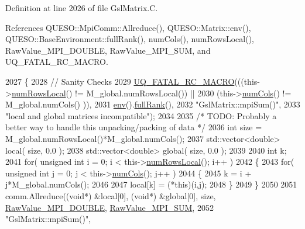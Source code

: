 Definition at line 2026 of file Gsl\-Matrix.\-C.



References Q\-U\-E\-S\-O\-::\-Mpi\-Comm\-::\-Allreduce(), Q\-U\-E\-S\-O\-::\-Matrix\-::env(), Q\-U\-E\-S\-O\-::\-Base\-Environment\-::full\-Rank(), num\-Cols(), num\-Rows\-Local(), Raw\-Value\-\_\-\-M\-P\-I\-\_\-\-D\-O\-U\-B\-L\-E, Raw\-Value\-\_\-\-M\-P\-I\-\_\-\-S\-U\-M, and U\-Q\-\_\-\-F\-A\-T\-A\-L\-\_\-\-R\-C\-\_\-\-M\-A\-C\-R\-O.


\begin{DoxyCode}
2027 \{
2028   \textcolor{comment}{// Sanity Checks}
2029   \hyperlink{_defines_8h_aa9107e1a9a5197371a412db3fa349988}{UQ\_FATAL\_RC\_MACRO}(((this->\hyperlink{class_q_u_e_s_o_1_1_gsl_matrix_ab5ec937a9fd439eef1a87e12c0dbccb4}{numRowsLocal}() != M\_global.numRowsLocal()) ||
2030                      (this->\hyperlink{class_q_u_e_s_o_1_1_gsl_matrix_ad5005f168fe030468e834776afb1859b}{numCols}()      != M\_global.numCols()     )),
2031                     \hyperlink{class_q_u_e_s_o_1_1_matrix_a1eefeca9f35200e8275fb0fdfa0c8684}{env}().\hyperlink{class_q_u_e_s_o_1_1_base_environment_a84a239e42ae443cf71db6e03e8159620}{fullRank}(),
2032                     \textcolor{stringliteral}{"GslMatrix::mpiSum()"},
2033                     \textcolor{stringliteral}{"local and global matrices incompatible"});
2034 
2035   \textcolor{comment}{/* TODO: Probably a better way to handle this unpacking/packing of data */}
2036   \textcolor{keywordtype}{int} size = M\_global.numRowsLocal()*M\_global.numCols();
2037   std::vector<double> local( size, 0.0 );
2038   std::vector<double> global( size, 0.0 );
2039 
2040   \textcolor{keywordtype}{int} k;
2041   \textcolor{keywordflow}{for}( \textcolor{keywordtype}{unsigned} \textcolor{keywordtype}{int} i = 0; i < this->\hyperlink{class_q_u_e_s_o_1_1_gsl_matrix_ab5ec937a9fd439eef1a87e12c0dbccb4}{numRowsLocal}(); i++ )
2042     \{
2043       \textcolor{keywordflow}{for}( \textcolor{keywordtype}{unsigned} \textcolor{keywordtype}{int} j = 0; j < this->\hyperlink{class_q_u_e_s_o_1_1_gsl_matrix_ad5005f168fe030468e834776afb1859b}{numCols}(); j++ )
2044         \{
2045           k = i + j*M\_global.numCols();
2046           
2047           local[k] = (*this)(i,j);
2048         \}
2049     \}
2050 
2051   comm.Allreduce((\textcolor{keywordtype}{void}*) &local[0], (\textcolor{keywordtype}{void}*) &global[0], size, 
      \hyperlink{_mpi_comm_8h_ad0f503bd9fecfe4e570ca3d15aaf2518}{RawValue\_MPI\_DOUBLE}, \hyperlink{_mpi_comm_8h_afbf78d291c032aa7f512bc566cee2bd1}{RawValue\_MPI\_SUM},
2052                  \textcolor{stringliteral}{"GslMatrix::mpiSum()"},

\end{DoxyCode}

